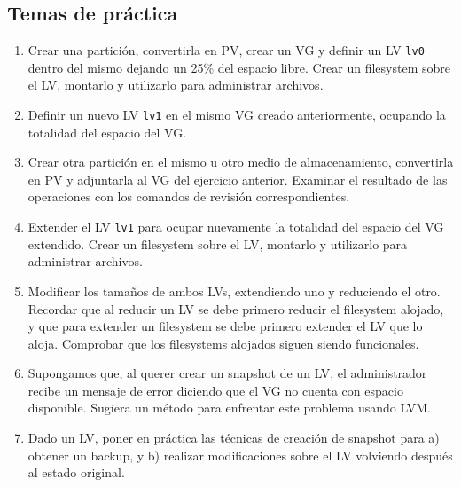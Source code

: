 \subsection{Temas de práctica}
\begin{enumerate}
	\item Crear una partición, convertirla en PV, crear un VG y definir un LV \lstinline$lv0$ dentro del mismo dejando un 25\% del espacio libre. Crear un filesystem sobre el LV, montarlo y utilizarlo para administrar archivos.
	\item Definir un nuevo LV \lstinline$lv1$ en el mismo VG creado anteriormente, ocupando la totalidad del espacio del VG.
	\item Crear otra partición en el mismo u otro medio de almacenamiento, convertirla en PV y adjuntarla al VG del ejercicio anterior. Examinar el resultado de las operaciones con los comandos de revisión correspondientes. 
	\item Extender el LV \lstinline$lv1$ para ocupar nuevamente la totalidad del espacio del VG extendido. Crear un filesystem sobre el LV, montarlo y utilizarlo para administrar archivos.
	\item Modificar los tamaños de ambos LVs, extendiendo uno y reduciendo el otro. Recordar que al reducir un LV se debe primero reducir el filesystem alojado, y que para extender un filesystem se debe primero extender el LV que lo aloja. Comprobar que los filesystems alojados siguen siendo funcionales.
	\item Supongamos que, al querer crear un snapshot de un LV, el administrador recibe un mensaje de error diciendo que el VG no cuenta con espacio disponible. Sugiera un método para enfrentar este problema usando LVM.
	\item Dado un LV, poner en práctica las técnicas de creación de snapshot para a) obtener un backup, y b) realizar modificaciones sobre el LV volviendo después al estado original.  
\end{enumerate}